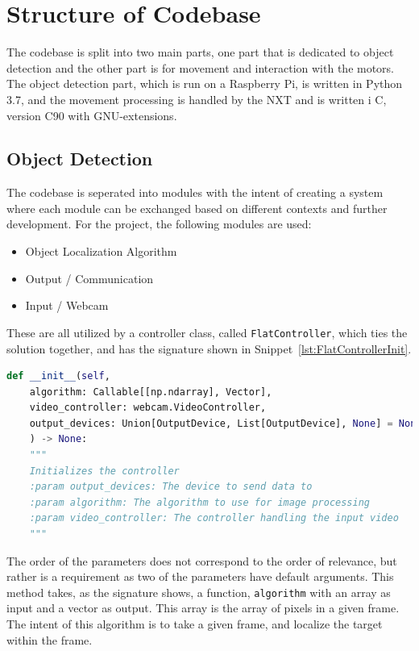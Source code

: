 \section{Structure of Codebase}
The codebase is split into two main parts, one part that is dedicated to object detection and the other part is for movement and interaction with the motors.
The object detection part, which is run on a Raspberry Pi, is written in Python 3{.}7, and the movement processing is handled by the NXT and is written i C, version C90 with GNU-extensions.


\subsection{Object Detection}
The codebase is seperated into modules with the intent of creating a system where each module can be exchanged based on different contexts and further development.
For the project, the following modules are used:
\begin{itemize}
	\item Object Localization Algorithm
	\item Output / Communication
	\item Input / Webcam
\end{itemize}

These are all utilized by a controller class, called \texttt{FlatController}, which ties the solution together, and has the signature shown in Snippet~\ref{lst:FlatControllerInit}.
\begin{lstlisting}[language=Python,label={lst:FlatControllerInit},caption={Initialization method of the \texttt{FlatController} class}]
def __init__(self,
	algorithm: Callable[[np.ndarray], Vector],
	video_controller: webcam.VideoController,
	output_devices: Union[OutputDevice, List[OutputDevice], None] = None,
	) -> None:
	"""
	Initializes the controller
	:param output_devices: The device to send data to
	:param algorithm: The algorithm to use for image processing
	:param video_controller: The controller handling the input video
	"""
\end{lstlisting}

The order of the parameters does not correspond to the order of relevance, but rather is a requirement as two of the parameters have default arguments.
This method takes, as the signature shows, a function, \texttt{algorithm} with an array as input and a vector as output.
This array is the array of pixels in a given frame.
The intent of this algorithm is to take a given frame, and localize the target within the frame.


